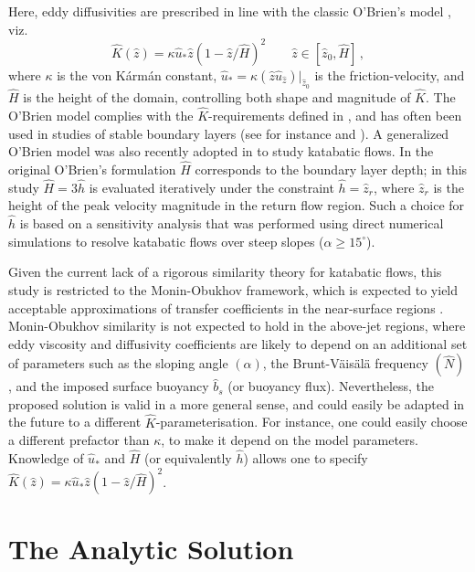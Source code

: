 Here, eddy diffusivities are prescribed in line with the classic O'Brien's model \citep{O'Brien1970}, viz. 
%
\begin{equation}
	\hat{K}(\hat{z}) = \kappa \hat{u}_*\hat{z}(1-\hat{z}/\hat{H})^2  \qquad \hat{z} \in [\hat{z}_0,\hat{H}] \, ,
\end{equation}
%
where $\kappa$ is the von K\'arm\'an constant, $\hat{u}_* = \kappa (\hat{z} \hat{u}_{\hat{z}})|_{\hat{z}_0}$ is the friction-velocity, and $\hat{H}$ is the height of the domain, controlling both shape and magnitude of $\hat{K}$. 
The O'Brien model complies with the $\hat{K}$-requirements defined in \citet{Grisogono2002}, and has often been used in studies of stable boundary layers (see for instance \citet{pielke1984mesoscale} and \citet{Stull1988}). A generalized O'Brien model was also recently adopted in \citet{grisogono2001katabatic} to study katabatic flows.
In the original O'Brien's formulation $\hat{H}$ corresponds to the boundary layer depth; in this study $\hat{H}=3\hat{h}$ is evaluated iteratively under the constraint $\hat{h}=\hat{z}_r$, where $\hat{z}_r$ is the height of the peak velocity magnitude in the return flow region. 
Such a choice for $\hat{h}$ is based on a sensitivity analysis that was performed using direct numerical simulations to resolve katabatic flows over steep slopes ($\alpha \geq 15^{\circ}$). 

Given the current lack of a rigorous similarity theory for katabatic flows, this study is restricted to the Monin-Obukhov framework, which is expected to yield acceptable approximations of transfer coefficients in the near-surface regions \citep{gutman_1983}.
Monin-Obukhov similarity is not expected to hold in the above-jet regions, where eddy viscosity and diffusivity coefficients are likely to depend on an additional set of parameters such as the sloping angle $(\alpha)$, the Brunt-V\"ais\"al\"a frequency $(\hat{N})$, and the imposed surface buoyancy $\hat{b}_s$ (or buoyancy flux). Nevertheless, the proposed solution is valid in a more general sense, and could easily be adapted in the future to a different $\hat{K}$-parameterisation. 
For instance, one could easily choose a different prefactor than $\kappa$, to make it depend on the model parameters.
Knowledge of $\hat{u}_*$ and $\hat{H}$ (or equivalently $\hat{h}$) allows one to specify $\hat{K}(\hat{z}) = \kappa \hat{u}_* \hat{z}(1-\hat{z}/\hat{H})^2$. 




\section{The Analytic Solution}

